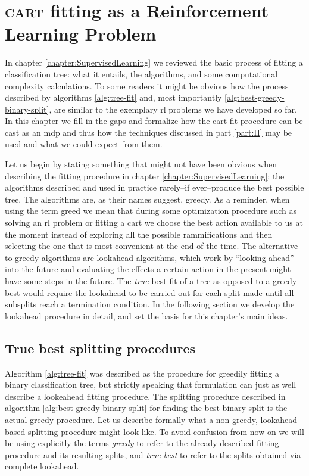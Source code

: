 \chapter{\textsc{cart} fitting as a Reinforcement Learning Problem}
\label{chapter:CARTasRLP}

In chapter \ref{chapter:SupervisedLearning} we reviewed the basic process of
fitting a classification tree: what it entails, the algorithms, and some
computational complexity calculations. To some readers it might be obvious how
the process described by algorithms \ref{alg:tree-fit} and, most importantly
\ref{alg:best-greedy-binary-split}, are similar to the exemplary \ac{rl}
problems we have developed so far. In this chapter we fill in the gaps and
formalize how the \ac{cart} fit procedure can be cast as an \ac{mdp} and thus how the
techniques discussed in part \ref{part:II} may be used and what we could expect
from them.

Let us begin by stating something that might not have been obvious when
describing the fitting procedure in chapter \ref{chapter:SupervisedLearning}:
the algorithms described and used in practice rarely--if ever--produce the
best possible tree. The algorithms are, as their names suggest, greedy. As a
reminder, when using the term greed we mean that during some optimization
procedure such as solving an \ac{rl} problem or fitting a \ac{cart} we choose
the best action available to us at the moment instead of exploring all the
possible rammifications and then selecting the one that is most convenient at
the end of the time. The alternative to greedy algorithms are lookahead
algorithms, which work by ``looking ahead'' into the future and evaluating the
effects a certain action in the present might have some steps in the future. The
\emph{true} best fit of a tree as opposed to a greedy best would require the
lookahead to be carried out for each split made until all subsplits reach a
termination condition. In the following section we develop the lookahead
procedure in detail, and set the basis for this chapter's main ideas.

\section{True best splitting procedures}

Algorithm \ref{alg:tree-fit} was described as the procedure for greedily fitting
a binary classification tree, but strictly speaking that formulation can just as
well describe a lookeahead fitting procedure. The splitting procedure described
in algorithm \ref{alg:best-greedy-binary-split} for finding the best binary
split is the actual greedy procedure. Let us describe formally what a
non-greedy, lookahead-based splitting procedure might look like. To avoid
confusion from now on we will be using explicitly the terms \emph{greedy} to
refer to the already described fitting procedure and its resulting splits, and
\emph{true best} to refer to the splits obtained via complete lookahead. 


